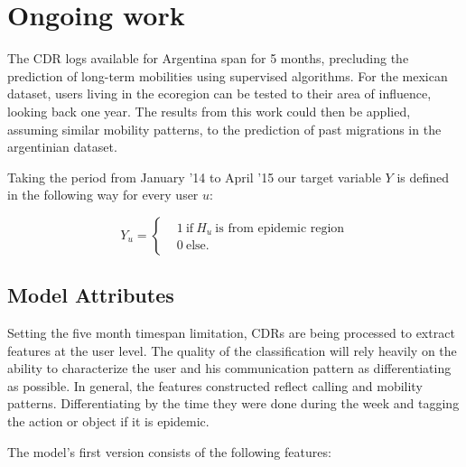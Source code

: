 \section{Ongoing work}

The CDR logs available for Argentina span for 5 months, precluding the prediction of long-term mobilities using supervised algorithms. For the mexican dataset, users living in the ecoregion can be tested to their area of influence, looking back one year. The results from this work could then be applied, assuming similar mobility patterns, to the prediction of past migrations in the argentinian dataset.

Taking the period from January '14 to April '15 our target variable $Y $ is defined in the following way for every user $u$: 

\[
    Y_u =
      \begin{cases}
        &1 \ \mbox{if} \ H_u \ \mbox{is from epidemic region}\\
        &0 \ \mbox{else}.
      \end{cases}
    \]
    
\subsection{Model Attributes}

Setting the five month timespan limitation, CDRs are being processed to extract features at the user level. The quality of the classification will rely heavily on the ability to characterize the user and his communication pattern as differentiating as possible. In general, the features constructed reflect calling and mobility patterns. Differentiating by the time they were done during the week and tagging the action or object if it is epidemic. 

The model's first version consists of the following features:

